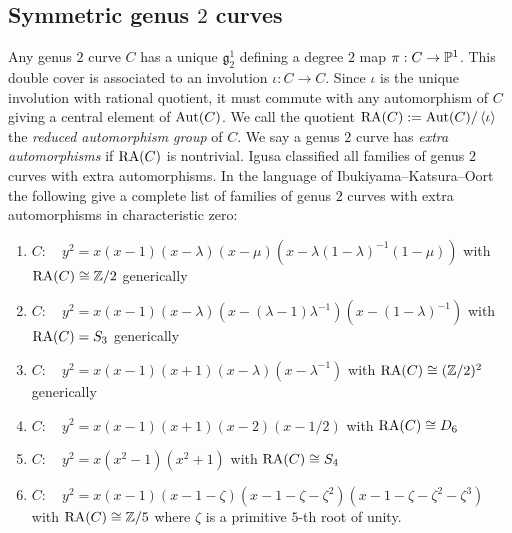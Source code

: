 \documentclass[main.tex]{subfiles}
\begin{document}
\subsection{Symmetric genus $2$ curves}

Any genus $2$ curve $C$ has a unique $\mathfrak{g}^{1}_{2}$ defining a degree $2$ map $\pi : C \to \P^1$. This double cover is associated to an involution $\iota : C \to C$. Since $\iota$ is the unique involution with rational quotient, it must commute with any automorphism of $C$ giving a central element of $\Aut(C)$. We call the quotient $\RA(C) := \Aut(C) / \left< \iota \right>$ the \textit{reduced automorphism group} of $C$. We say a genus $2$ curve has \textit{extra automorphisms} if $\RA(C)$ is nontrivial. Igusa \cite{igusa_genus_2} classified all families of genus $2$ curves with extra automorphisms. In the language of Ibukiyama--Katsura--Oort \cite{Ibukiyama-Katsura-Oort} the following give a complete list of families of genus $2$ curves with extra automorphisms in characteristic zero:
\begin{enumerate}
\item[(1)] $C : \quad y^2 = x(x-1)(x-\lambda)(x-\mu)(x-\lambda(1-\lambda)^{-1}(1-\mu))$ with $\RA(C) \cong \Z/2$ generically
\item[(2)] $C : \quad y^2 = x(x-1)(x-\lambda)(x-(\lambda-1) \lambda^{-1})(x - (1-\lambda)^{-1})$ with $\RA(C) = S_3$ generically
\item[(3)] $C : \quad y^2 = x(x-1)(x+1)(x-\lambda)(x-\lambda^{-1})$ with $\RA(C) \cong (\Z/2)^2$ generically
\item[(4)] $C : \quad y^2 = x(x-1)(x+1)(x-2)(x-1/2)$ with $\RA(C) \cong D_{6}$
\item[(5)] $C : \quad y^2 =x(x^2-1)(x^2+1)$ with $\RA(C) \cong S_4$
\item[(6)] $C : \quad y^2 = x(x-1)(x-1-\zeta)(x-1-\zeta-\zeta^2)(x-1-\zeta-\zeta^2-\zeta^3)$ with $\RA(C) \cong \Z/5$ where $\zeta$ is a primitive $5$-th root of unity.
\end{enumerate} 
\end{document}
